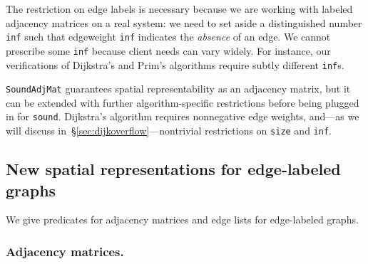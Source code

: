 The restriction on edge labels is necessary because we are working
with labeled adjacency matrices on a real system: we need to set aside
a distinguished number \texttt{inf} such that edgeweight \texttt{inf}
indicates the \emph{absence} of an edge. We cannot
prescribe some \texttt{inf} because client needs can vary widely. For
instance, our verifications of Dijkstra's and Prim's algorithms
require subtly different \texttt{inf}s.

\texttt{SoundAdjMat} guarantees spatial representability
as an adjacency matrix, but it can be extended with further
algorithm-specific restrictions before
being plugged in for \texttt{sound}. Dijkstra's algorithm
requires nonnegative edge weights, and---as we will discuss in~\S\ref{sec:dijkoverflow}---nontrivial restrictions on \texttt{size} and \texttt{inf}.

\subsection{New spatial representations for edge-labeled graphs}
\label{sec:newspatial}

We give predicates for adjacency matrices and edge lists
for edge-labeled graphs.

\subsubsection{Adjacency matrices.}

